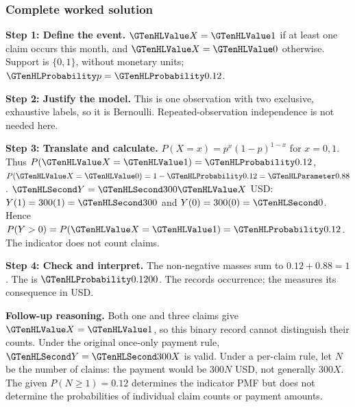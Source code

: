 \subsubsection*{Complete worked solution}\label{sol:c3-claim}
\par\noindent\begin{minipage}{\linewidth}
\textbf{Step 1: Define the event.} $\Indicator{X}=\Indicator{1}$ if at least one claim occurs this month, and $\Indicator{X}=\Indicator{0}$ otherwise. Support is $\{0,1\}$, without monetary units; $\SuccessProb{p}=\SuccessProb{0.12}$.
\end{minipage}\par\medskip
\par\noindent\begin{minipage}{\linewidth}
\textbf{Step 2: Justify the model.} This is one observation with two exclusive, exhaustive labels, so it is Bernoulli. Repeated-observation independence is not needed here.
\end{minipage}\par\medskip
\par\noindent\begin{minipage}{\linewidth}
\textbf{Step 3: Translate and calculate.} $P(X=x)=p^x(1-p)^{1-x}$ for $x=0,1$. Thus $P(\Indicator{X}=\Indicator{1})=\SuccessProb{0.12}$, $P(\Indicator{X}=\Indicator{0})=1-\SuccessProb{0.12}=\FailureProb{0.88}$. $\Money{Y}=\Money{300}\Indicator{X}$ USD: $Y(1)=300(1)=\Money{300}$ and $Y(0)=300(0)=\Money{0}$. Hence $P(Y>0)=P(\Indicator{X}=\Indicator{1})=\SuccessProb{0.12}$. The indicator does not count claims.
\end{minipage}\par\medskip
\par\noindent\begin{minipage}{\linewidth}
\textbf{Step 4: Check and interpret.} The non-negative masses sum to $ 0.12+0.88=1$. The  is $\SuccessProb{0.1200}$. The  records occurrence; the  measures its consequence in USD.
\end{minipage}\par\medskip

\textbf{Follow-up reasoning.} Both one and three claims give $\Indicator{X}=\Indicator{1}$, so this binary record cannot distinguish their counts. Under the original once-only payment rule, $\Money{Y}=\Money{300}X$ is valid. Under a per-claim rule, let $N$ be the number of claims: the payment would be $300N$ USD, not generally $300X$. The given $P(N\geq1)=0.12$ determines the indicator PMF but does not determine the probabilities of individual claim counts or payment amounts.

